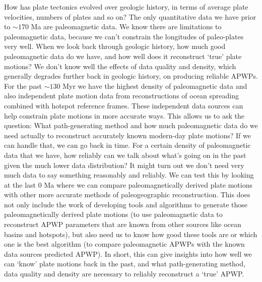 How has plate tectonics evolved over geologic history, in terms of average plate
velocities, numbers of plates and so on? The only quantitative data we have
prior to ${\sim}170$ Ma are paleomagnetic data. We know there are limitations to
paleomagnetic data, because we can't constrain the longitudes of paleo-plates
very well. When we look back through geologic history, how much good
paleomagnetic data do we have, and how well does it reconstruct `true' plate
motions? We don't know well the effects of data quality and density, which
generally degrades further back in geologic history, on producing reliable
APWPs. For the past ${\sim}130$ Myr we have the highest density of
paleomagnetic data and also independent plate motion data from reconstructions
of ocean spreading combined with hotspot reference frames. These independent
data sources can help constrain plate motions in more accurate ways. This allows
us to ask the question: What path-generating method and how much paleomagnetic
data do we need actually to reconstruct accurately known modern-day plate
motions? If we can handle that, we can go back in time. For a certain density of
paleomagnetic data that we have, how reliably can we talk about what's going on
in the past given the much lower data distribution? It might turn out we don't
need very much data to say something reasonably and reliably. We can test this
by looking at the last 0 Ma where we can compare paleomagnetically
derived plate motions with other more accurate methods of paleogeographic
reconstruction. This does not only include the work of developing tools and
algorithms to generate those paleomagnetically derived plate motions (to use
paleomagnetic data to reconstruct APWP parameters that are known from other
sources like ocean basins and hotspots), but also need us to know how good these
tools are or which one is the best algorithm (to compare paleomagnetic APWPs
with the known data sources predicted APWP). In short, this can give insights
into how well we can `know' plate motions back in the past, and what
path-generating method, data quality and density are necessary to reliably
reconstruct a `true' APWP\@.

